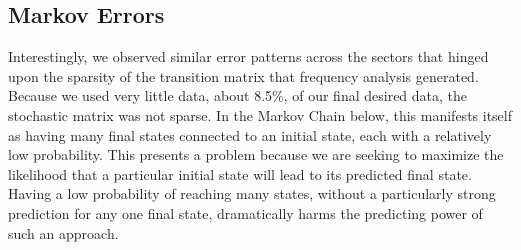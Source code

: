 \documentclass{article}
\begin{document}
\subsection{Markov Errors}
Interestingly, we observed similar error patterns across the sectors that hinged upon the sparsity of the transition matrix that frequency analysis generated. Because we used very little data, about 8.5\%, of our final desired data, the stochastic matrix was not sparse. In the Markov Chain below, this manifests itself as having many final states connected to an initial state, each with a relatively low probability. This presents a problem because we are seeking to maximize the likelihood that a particular initial state will lead to its predicted final state. Having a low probability of reaching many states, without a particularly strong prediction for any one final state, dramatically harms the predicting power of such an approach.
\end{document}
